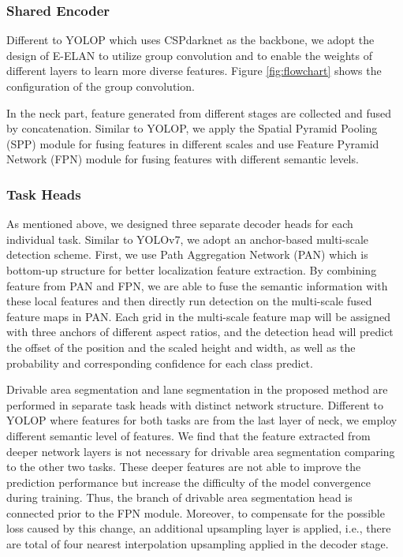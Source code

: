 \documentclass[10pt,twocolumn,letterpaper]{article}
\begin{document}
\subsubsection{Shared Encoder}
Different to YOLOP which uses CSPdarknet as the backbone, we adopt the design of E-ELAN to utilize group convolution and to enable the weights of different layers to learn more diverse features. Figure \ref{fig:flowchart} shows the configuration of the group convolution. 

In the neck part, feature generated from different stages are collected and fused by concatenation. 
Similar to YOLOP, we apply the Spatial Pyramid Pooling (SPP) module \cite{he2015spatial} for fusing features in different scales and use Feature Pyramid Network (FPN) module\cite{lin2017feature} for fusing features with different semantic levels.

\subsubsection{Task Heads}
As mentioned above, we designed three separate decoder heads for each individual task. 
Similar to YOLOv7, we adopt an anchor-based multi-scale detection scheme. First, we use Path Aggregation Network (PAN) \cite{liu2018path} which is bottom-up structure for better localization feature extraction. By combining feature from PAN and FPN, we are able to fuse the semantic information with these local features and then directly run detection on the multi-scale fused feature maps in PAN. Each grid in the multi-scale feature map will be assigned with three anchors of different aspect ratios, and the detection head will predict the offset of the position and the scaled height and width, as well as the probability and corresponding confidence for each class predict.

Drivable area segmentation and lane segmentation in the proposed method are performed in separate task heads with distinct network structure. Different to YOLOP where features for both tasks are from the last layer of neck, we employ different semantic level of features.
We find that the feature extracted from deeper network layers is not necessary for drivable area segmentation comparing to the other two tasks. These deeper features are not able to improve the prediction performance but increase the difficulty of the model convergence during training. Thus, the branch of drivable area segmentation head is connected prior to the FPN module. Moreover, to compensate for the possible loss caused by this change, an additional upsampling layer is applied, i.e., there are total of four nearest interpolation upsampling applied in the decoder stage. 
\end{document}

